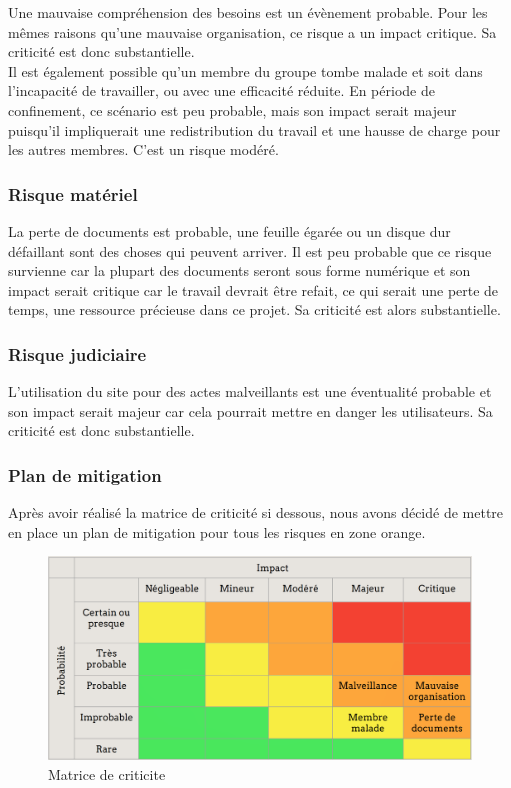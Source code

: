 \documentclass[a4paper,11pt]{article}
\begin{document}
Une mauvaise compréhension des besoins est un évènement probable. Pour les mêmes raisons
qu'une mauvaise organisation, ce risque a un impact critique. Sa criticité est donc substantielle.\\

Il est également possible qu'un membre du groupe tombe malade et soit dans l'incapacité de travailler, ou avec une efficacité réduite. En période de confinement, ce scénario est peu probable, mais son impact
serait majeur puisqu'il impliquerait une redistribution du travail et une hausse de charge pour les autres membres. C'est un risque modéré.\\

\subsubsection{Risque matériel}

La perte de documents est probable, une feuille égarée ou un disque dur défaillant sont des choses
qui peuvent arriver. Il est peu probable que ce risque survienne car la plupart des documents
seront sous forme numérique et son impact serait critique car le travail
devrait être refait, ce qui serait une perte de temps, une ressource précieuse dans
ce projet. Sa criticité est alors substantielle.\\

\subsubsection{Risque judiciaire}

L’utilisation du site pour des actes malveillants est une éventualité probable et son impact serait
majeur car cela pourrait mettre en danger les utilisateurs. Sa criticité est donc substantielle.\\

\subsubsection{Plan de mitigation}

Après avoir réalisé la matrice de criticité si dessous, nous avons décidé de mettre en place un plan
de mitigation pour tous les risques en zone orange.

\begin{figure}[H]
  \includegraphics[width=\linewidth]{images/matrice-criticite.png}
  \caption{Matrice de criticite}
  \label{fig:matrice criticite}
\end{figure}
\end{document}
